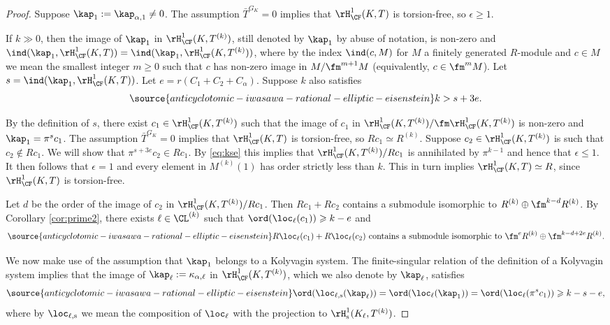 \begin{proof}
Suppose $\kap_1:=\kap_{\alpha,1} \neq 0$.
The assumption $\bar{T}^{G_K}=0$ implies that $\rH^1_{\CF}(K,T)$ is torsion-free, so $\epsilon \geqslant 1$.

If $k\gg 0$, then the image of $\kap_1$ in $\rH^1_{\CF}(K,T^{(k)})$, still denoted by $\kap_1$ by abuse of notation,
is non-zero and $\ind(\kap_1, \rH^1_{\CF}(K,T))=\ind(\kap_1, \rH^1_{\CF}(K,T^{(k)}))$, where by the index $\ind(c,M)$
for $M$ a finitely generated $R$-module and $c\in M$ we mean the smallest integer $m\geqslant 0$ such that $c$ has non-zero
image in $M/\fm^{m+1}M$ (equivalently, $c\in \fm^mM$).
Let $s= \ind(\kap_1, \rH^1_{\CF}(K,T))$. Let $e= r(C_1+C_2+C_\alpha)$. Suppose $k$ also satisfies
\begin{equation}\label{eq:kse}
\source{anticyclotomic-iwasawa-rational-elliptic-eisenstein}
k > s + 3e.
\end{equation}

By the definition of $s$, there exist $c_1\in \rH^1_{\CF}(K,T^{(k)})$ such that
the image of $c_1$ in $\rH^1_{\CF}(K,T^{(k)})/\fm \rH^1_{\CF}(K,T^{(k)})$ is non-zero and $\kap_1 = \pi^{s}c_1$.
The assumption $\bar{T}^{G_K}=0$ implies that $\rH^1_{\CF}(K,T)$ is torsion-free, so $Rc_1 \simeq R^{(k)}$.
Suppose $c_2\in \rH^1_{\CF}(K,T^{(k)})$ is such that $c_2\not \in R c_1$. We will show that
$\pi^{s+3e} c_2 \in Rc_1$. By \eqref{eq:kse} this implies
that $\rH^1_{\CF}(K,T^{(k)})/Rc_1$ is annihilated by $\pi^{k-1}$ and hence that $\epsilon \leqslant 1$.
It then follows that $\epsilon  = 1$ and every element in $M^{(k)}(1)$ has order strictly less than $k$.
This in turn implies $\rH^1_{\CF}(K,T)\simeq R$, since $\rH^1_{\CF}(K,T)$ is torsion-free.

Let $d$ be the order of the image of $c_2$ in $\rH^1_{\CF}(K,T^{(k)})/Rc_1$. Then
$Rc_1 + Rc_2$ contains a submodule isomorphic to $R^{(k)} \oplus \fm^{k-d}R^{(k)}$.
By Corollary \ref{cor:prime2}, there exists $\ell\in \CL^{(k)}$ such that
$\ord(\loc_\ell(c_1)) \geqslant k-e$ and
\begin{equation}\label{eq:rk1}
\source{anticyclotomic-iwasawa-rational-elliptic-eisenstein}
\text{$R\loc_\ell(c_1) + R\loc_\ell(c_2)$ contains a submodule isomorphic to $\fm^{e}R^{(k)}\oplus \fm^{k-d+2e}R^{(k)}$.}
\end{equation}


We now make use of the assumption that $\kap_1$ belongs to a Kolyvagin system.
The finite-singular relation of the definition of a Kolyvagin system implies that the image of $\kap_\ell:=\kappa_{\alpha,\ell}$ in $\rH^1_{\CF}(K,T^{(k)})$,
which we also denote by $\kap_\ell$, satisfies
\begin{equation}\label{eq:rk2}
\source{anticyclotomic-iwasawa-rational-elliptic-eisenstein}
\ord(\loc_{\ell,{\rm s}}(\kap_\ell)) = \ord(\loc_\ell(\kap_1)) = \ord(\loc_\ell(\pi^{s}c_1)) \geqslant k-s-e,
\end{equation}
where by $\loc_{\ell,{\rm s}}$ we mean the composition of $\loc_\ell$ with the projection to
$\rH^1_{\rm s}(K_\ell, T^{(k)})$.




\end{proof}
